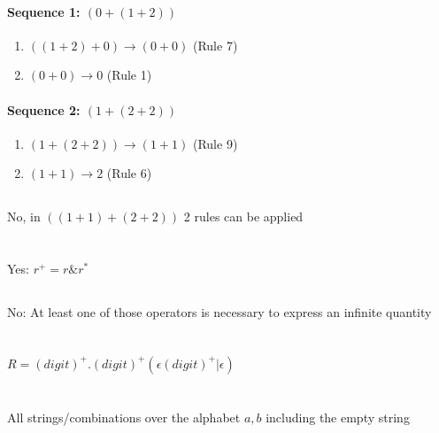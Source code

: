 \documentclass{article}
\begin{document}
      \paragraph{Sequence 1: $(0+(1+2))$}
        \begin{enumerate}
          \item $ ((1+2) + 0) \rightarrow (0 + 0) $ (Rule 7)
          \item $ (0 + 0) \rightarrow 0 $ (Rule 1) 
        \end{enumerate}
      \paragraph{Sequence 2: $(1+(2+2))$}
        \begin{enumerate}
          \item $ (1 + (2 + 2)) \rightarrow (1 + 1) $ (Rule 9)
          \item $ (1 + 1) \rightarrow 2 $ (Rule 6)
        \end{enumerate}
  \subsection{}
    No, in $ ((1 + 1) + (2+2)) $ 2 rules can be applied

\section{}
    \subsection{}
      Yes: $ r^+ = r\&r^* $
    \subsection{}
      No: At least one of those operators is necessary to express an
      infinite quantity
\section{}
  $ R = (digit)^+.(digit)^+(\epsilon(digit)^+ | \epsilon) $

\section{}
  \subsection{}
    All strings/combinations over the alphabet $ {a,b} $ including the empty string
\end{document}
